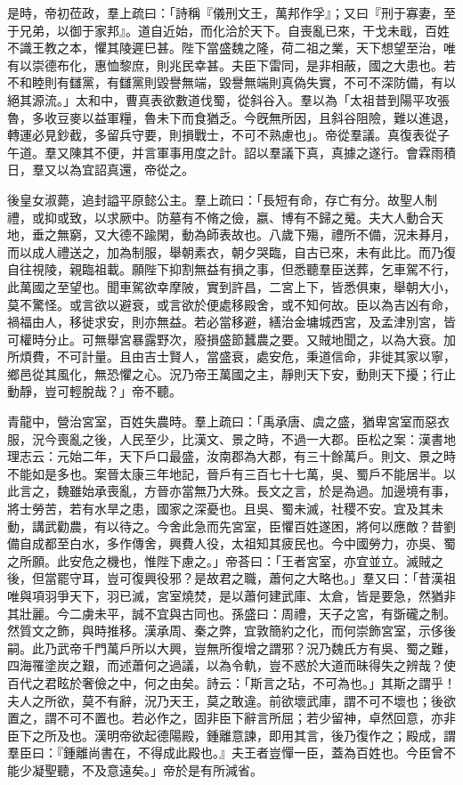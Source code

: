 \begin{pinyinscope}
是時，帝初莅政，羣上疏曰：「詩稱『儀刑文王，萬邦作孚』；又曰『刑于寡妻，至于兄弟，以御于家邦』。道自近始，而化洽於天下。自喪亂已來，干戈未戢，百姓不識王教之本，懼其陵遲巳甚。陛下當盛魏之隆，荷二祖之業，天下想望至治，唯有以崇德布化，惠恤黎庶，則兆民幸甚。夫臣下雷同，是非相蔽，國之大患也。若不和睦則有讎黨，有讎黨則毀譽無端，毀譽無端則真偽失實，不可不深防備，有以絕其源流。」太和中，曹真表欲數道伐蜀，從斜谷入。羣以為「太祖昔到陽平攻張魯，多收豆麥以益軍糧，魯未下而食猶乏。今旣無所因，且斜谷阻險，難以進退，轉運必見鈔截，多留兵守要，則損戰士，不可不熟慮也」。帝從羣議。真復表從子午道。羣又陳其不便，并言軍事用度之計。詔以羣議下真，真據之遂行。會霖雨積日，羣又以為宜詔真還，帝從之。

後皇女淑薨，追封謚平原懿公主。羣上疏曰：「長短有命，存亡有分。故聖人制禮，或抑或致，以求厥中。防墓有不脩之儉，嬴、博有不歸之䰟。夫大人動合天地，垂之無窮，又大德不踰閑，動為師表故也。八歲下殤，禮所不備，況未朞月，而以成人禮送之，加為制服，舉朝素衣，朝夕哭臨，自古已來，未有此比。而乃復自往視陵，親臨祖載。願陛下抑割無益有損之事，但悉聽羣臣送葬，乞車駕不行，此萬國之至望也。聞車駕欲幸摩陂，實到許昌，二宮上下，皆悉俱東，舉朝大小，莫不驚怪。或言欲以避衰，或言欲於便處移殿舍，或不知何故。臣以為吉凶有命，禍福由人，移徙求安，則亦無益。若必當移避，繕治金墉城西宮，及孟津別宮，皆可權時分止。可無舉宮暴露野次，廢損盛節蠶農之要。又賊地聞之，以為大衰。加所煩費，不可計量。且由吉士賢人，當盛衰，處安危，秉道信命，非徙其家以寧，鄉邑從其風化，無恐懼之心。況乃帝王萬國之主，靜則天下安，動則天下擾；行止動靜，豈可輕脫哉？」帝不聽。

青龍中，營治宮室，百姓失農時。羣上疏曰：「禹承唐、虞之盛，猶卑宮室而惡衣服，況今喪亂之後，人民至少，比漢文、景之時，不過一大郡。臣松之案：漢書地理志云：元始二年，天下戶口最盛，汝南郡為大郡，有三十餘萬戶。則文、景之時不能如是多也。案晉太康三年地記，晉戶有三百七十七萬，吳、蜀戶不能居半。以此言之，魏雖始承喪亂，方晉亦當無乃大殊。長文之言，於是為過。加邊境有事，將士勞苦，若有水旱之患，國家之深憂也。且吳、蜀未滅，社稷不安。宜及其未動，講武勸農，有以待之。今舍此急而先宮室，臣懼百姓遂困，將何以應敵？昔劉備自成都至白水，多作傳舍，興費人役，太祖知其疲民也。今中國勞力，亦吳、蜀之所願。此安危之機也，惟陛下慮之。」帝荅曰：「王者宮室，亦宜並立。滅賊之後，但當罷守耳，豈可復興役邪？是故君之職，蕭何之大略也。」羣又曰：「昔漢祖唯與項羽爭天下，羽已滅，宮室燒焚，是以蕭何建武庫、太倉，皆是要急，然猶非其壯麗。今二虜未平，誠不宜與古同也。孫盛曰：周禮，天子之宮，有斲礲之制。然質文之飾，與時推移。漢承周、秦之弊，宜敦簡約之化，而何崇飾宮室，示侈後嗣。此乃武帝千門萬戶所以大興，豈無所復增之謂邪？況乃魏氏方有吳、蜀之難，四海罹塗炭之艱，而述蕭何之過議，以為令軌，豈不惑於大道而昧得失之辨哉？使百代之君眩於奢儉之中，何之由矣。詩云：「斯言之玷，不可為也。」其斯之謂乎！夫人之所欲，莫不有辭，況乃天王，莫之敢違。前欲壞武庫，謂不可不壞也；後欲置之，謂不可不置也。若必作之，固非臣下辭言所屈；若少留神，卓然回意，亦非臣下之所及也。漢明帝欲起德陽殿，鍾離意諫，即用其言，後乃復作之；殿成，謂羣臣曰：『鍾離尚書在，不得成此殿也。』夫王者豈憚一臣，蓋為百姓也。今臣曾不能少凝聖聽，不及意遠矣。」帝於是有所減省。


\end{pinyinscope}
